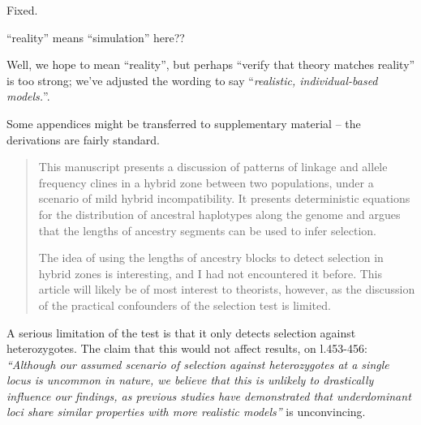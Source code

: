 \reply
Fixed.

\begin{point}{\revref}
``reality'' means ``simulation'' here??
\end{point}

\reply
Well, we hope to mean ``reality'', but perhaps ``verify that theory matches reality'' is too strong; we've adjusted the wording to say ``\emph{realistic, individual-based models.}''.

\begin{point}{}
 Some appendices might be transferred to supplementary material -- the derivations are fairly standard.
\end{point}

\reply
{}





\begin{quote}
    This manuscript presents a discussion of patterns of linkage and allele frequency clines in a hybrid zone between two populations, under a scenario of mild hybrid incompatibility. It presents deterministic equations for the distribution of ancestral haplotypes along the genome and argues that the lengths of ancestry segments can be used to infer selection.

    The idea of using the lengths of ancestry blocks to detect selection in hybrid zones is interesting, and I had not encountered it before. This article will likely be of most interest to theorists, however, as the discussion of the practical confounders of the selection test is limited. 
\end{quote}

\begin{point}{}
    A serious limitation of the test is that it only detects selection against heterozygotes. The claim that this would not affect results, on l.453-456:
    \textit{``Although our assumed scenario of selection against heterozygotes at a single locus is uncommon in nature, we believe that this is unlikely to drastically influence our findings, as previous studies have demonstrated that underdominant loci share similar properties with more realistic models''}
    is unconvincing.
\end{point}

